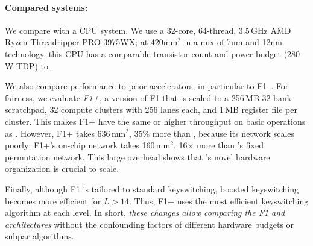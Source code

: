 \paragraph{Compared systems:}
We compare \name with a CPU system. 
We use a 32-core, 64-thread, 3.5\,GHz AMD Ryzen Threadripper PRO 3975WX;
at 420mm$^2$ in a mix of 7nm and 12nm technology, this CPU has a comparable
transistor count and power budget (280\,W TDP) to \name.


We also compare performance to prior accelerators, in particular to 
F1~\cite{feldmann:micro21:f1}.
For fairness, we evaluate \emph{F1+}, a version of F1 that is scaled to a 256\,MB 32-bank
scratchpad, 32 compute clusters with 256 lanes each, and 1\,MB register file per cluster.
This makes F1+ have the same or higher throughput on basic operations as \name.
However, F1+ takes 636\,mm$^2$, 35\% more than \name, because its network scales poorly:
F1+'s on-chip network takes 160\,mm$^2$, 16$\times$ more than \name's fixed permutation network.
This large overhead shows that \name's novel hardware organization is crucial to scale.

Finally, although F1 is tailored to standard keyswitching,
boosted keyswitching becomes more efficient for $L>14$.
Thus, F1+ uses the most efficient keyswitching algorithm at each level.
In short, \emph{these changes allow comparing the F1 and \name architectures}
without the confounding factors of different hardware budgets or subpar algorithms.

